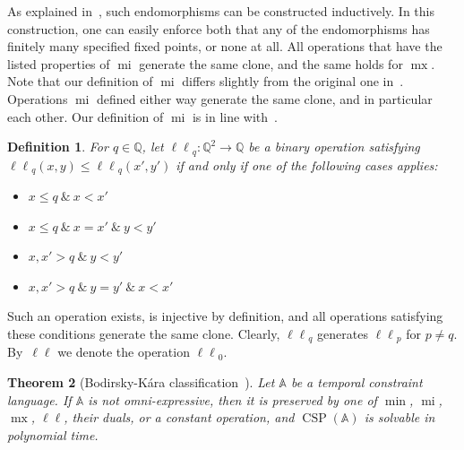 \documentclass[a4paper,reqno, cleveref]{amsart}
\newtheorem{theorem}{Theorem}[section]
\newtheorem{definition}[theorem]{Definition}
\newcommand{\Q}{\mathbb{Q}}
\DeclareMathOperator{\CSP}{CSP}
\DeclareMathOperator{\mx}{mx}
\DeclareMathOperator{\mi}{mi}
\newcommand{\sA}{\mathbb A}
\newcommand{\llp}[1]{{\ell \ell}_{#1}}
\begin{document}
As explained in~\cite{bodirsky_complexity_2010}, such endomorphisms can be constructed inductively. 
%
In this construction, one can easily enforce both that any of the endomorphisms has finitely many specified fixed points, or none at all.
%
All operations that have the listed properties of $\mi$ generate the same clone, and the same holds for $\mx$. 
%
%
%
Note that our definition of $\mi$ differs slightly from the original one in~\cite{bodirsky_complexity_2010}. 
%
Operations $\mi$ defined either way generate the same clone, and in particular each other.
%
Our definition of $\mi$ is in line  with~\cite{RydvalDescr}. 

    \begin{definition}
    For $q \in \Q$, let $\llp q: \Q^2 \to \Q$ be a binary operation satisfying $\llp q(x,y) \leq \llp q(x', y')$ if and only if one of the following cases applies: \begin{itemize}
        \item $x \leq q \ \& \ x < x' $
        \item $x \leq q \ \& \ x= x' \ \& \ y < y' $
        \item $x, x' > q \ \& \ y < y'$
        \item $x, x' > q \ \& \ y= y' \ \& \ x < x' $
    \end{itemize}
\end{definition}

Such an operation exists, is injective by definition, and all operations satisfying these conditions generate the same clone.
Clearly, $\llp q$  generates $\llp p$ for $p \neq q$. By~$\ell \ell$ we denote the operation $\llp 0$. 


\begin{theorem}[Bodirsky-K\'ara classification~\cite{bodirsky_complexity_2010}]\label{theorem:tractable_pols}
    Let $\sA$ be a temporal constraint language. 
    If $\sA$ is not omni-expressive, then it is preserved by one of  $\min$, $\mi$, $\mx$, $\ell\ell$, their duals, 
     or a constant operation, and $\CSP(\sA)$ is solvable in polynomial time. 
\end{theorem}
\end{document}
